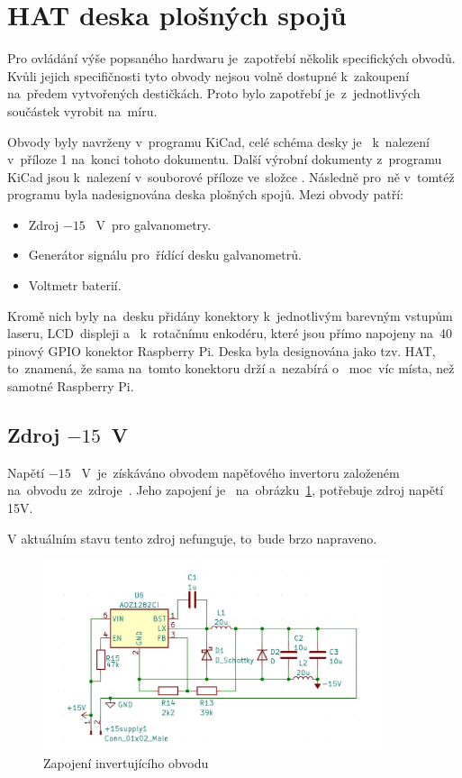 \section{HAT deska plošných spojů}
Pro ovládání výše popsaného hardwaru je~zapotřebí několik specifických obvodů.
Kvůli jejich specifičnosti tyto obvody nejsou volně dostupné k~zakoupení na~předem vytvořených destičkách. Proto bylo zapotřebí je~z~jednotlivých součástek vyrobit na~míru.

Obvody byly navrženy v~programu KiCad, celé schéma desky je ~k~nalezení  v~příloze 1 na~konci tohoto dokumentu. Další výrobní dokumenty  z~programu KiCad jsou  k~nalezení  v~souborové příloze ve~složce . Následně  pro~ně v~tomtéž programu byla nadesignována deska plošných spojů. Mezi obvody patří:
\begin{itemize}
  \item Zdroj $-15$ ~V~pro galvanometry.
  \item Generátor signálu  pro~řídící desku galvanometrů.
  \item Voltmetr baterií.
\end{itemize}

Kromě nich byly na~desku přidány konektory k~jednotlivým barevným vstupům laseru,  LCD~displeji a ~k~rotačnímu enkodéru, které jsou přímo napojeny na~40 pinový GPIO konektor Raspberry Pi.
Deska byla designována jako tzv. HAT, to~znamená, že sama na~tomto konektoru drží a~nezabírá o ~moc~víc místa, než samotné Raspberry Pi.

\subsection{Zdroj $-15$~V}\label{sec:negative-ps}
Napětí $-15$ ~V~je~získáváno obvodem napěťového invertoru založeném na~obvodu ze~zdroje~\cite{ampalyzer}. Jeho zapojení je ~na~obrázku~\ref{fig:negative-ps}, potřebuje zdroj napětí 15V.

V aktuálním stavu tento zdroj nefunguje, to~bude brzo napraveno.

\begin{figure}[htb]
  \centering
  \includegraphics[width=0.9\textwidth]{img/negative-ps.jpg}
  \caption{\label{fig:negative-ps} Zapojení invertujícího obvodu}
\end{figure}

